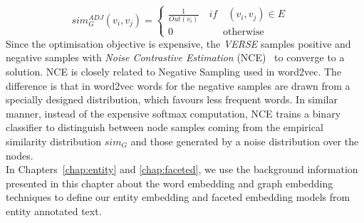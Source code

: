 \begin{equation}
sim^{ ADJ }_{ G }(v_{ i },v_{ j })=\left\{ \begin{matrix} \frac { 1 }{ Out(v_{ i }) } \quad if\quad (v_{ i },v_{ j })\in E\quad  \\ 0\quad \qquad \qquad \mathrm{otherwise} \end{matrix} \right.\label{eq:VERSE_simG}
\end{equation}
Since the optimisation objective is expensive, the \emph{VERSE} samples positive and negative samples with \emph{Noise Contrastive Estimation} (NCE)~ to converge to a solution. NCE is closely related to Negative Sampling used in word2vec. The difference is that in word2vec words for the negative samples are drawn from a specially designed distribution, which favours less frequent words. In similar manner, instead of the expensive softmax computation, NCE trains a binary classifier to distinguish between node samples coming from the empirical similarity distribution $sim_{G}$ and those generated by a noise distribution over the nodes. \\


In Chapters~\ref{chap:entity} and \ref{chap:faceted}, we use the background information presented in this chapter about the word embedding and graph embedding techniques to define our entity embedding and faceted embedding models from entity annotated text.
